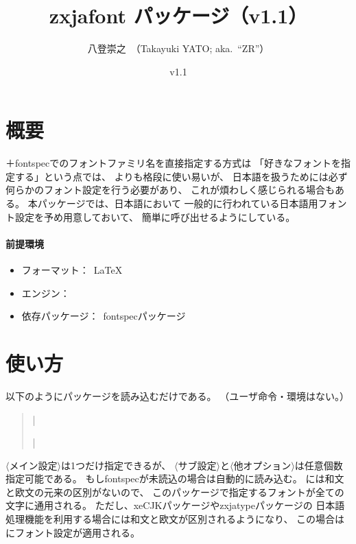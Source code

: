 \documentclass[xelatex,ja=standard,jafont=ipaex,
  a4paper]{bxjsarticle}
\newcommand{\PkgVersion}{1.1}
\newcommand{\PkgDate}{2020/02/08}
\newcommand{\Pkg}[1]{\textsf{#1}}
\newcommand{\Meta}[1]{$\langle$\mbox{}#1\mbox{}$\rangle$}
\newcommand{\Means}{：\ }
\newcommand{\JEmph}{\textgt}
\begin{document}
\title{\Pkg{zxjafont} パッケージ（v\PkgVersion）}
\author{八登崇之\ （Takayuki YATO; aka.~``ZR''）}
\date{v\PkgVersion\quad[\PkgDate]}
\maketitle

\section{概要}

{\XeLaTeX}＋\Pkg{fontspec}でのフォントファミリ名を直接指定する方式は
「好きなフォントを指定する」という点では、
{\pLaTeX}\>よりも格段に使い易いが、
日本語を扱うためには必ず何らかのフォント設定を行う必要があり、
これが煩わしく感じられる場合もある。
本パッケージでは、日本語\>{\LaTeX}\>において
一般的に行われている日本語用フォント設定を予め用意しておいて、
簡単に呼び出せるようにしている。

\paragraph{前提環境}\mbox{}
\begin{itemize}
\item フォーマット\Means {\LaTeX}
\item エンジン\Means {\XeTeX}
\item 依存パッケージ\Means \Pkg{fontspec}パッケージ
\end{itemize}

\section{使い方}

以下のようにパッケージを読み込むだけである。
（ユーザ命令・環境はない。）
\begin{quote}\small
|\usepackage[|\Meta{メイン設定}|,|\Meta{サブ設定}|,|%
\Meta{他オプション}|]{zxjafont}|
\end{quote}

\Meta{メイン設定}は1つだけ指定できるが、
\Meta{サブ設定}と\Meta{他オプション}は任意個数指定可能である。
もし\Pkg{fontspec}が未読込の場合は自動的に読み込む。
{\XeLaTeX}\>には和文と欧文の元来の区別がないので、
このパッケージで指定するフォントが全ての文字に通用される。
ただし、\Pkg{xeCJK}パッケージや\Pkg{zxjatype}パッケージの
日本語処理機能を利用する場合には和文と欧文が区別されるようになり、
この場合は\JEmph{和文のみ}にフォント設定が適用される。
\end{document}
